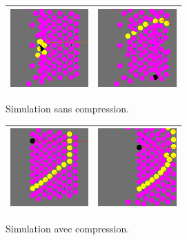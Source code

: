 \documentclass{beamer}
\begin{document}
\begin{frame}
  \begin{figure}
    \begin{tabular}{|M|M|}
      \hline
      \includegraphics[width=3cm]{Images/normal_1.png} &
      \includegraphics[width=3cm]{Images/normal_2.png} \\
      \hline
    \end{tabular}
    \caption{Simulation sans compression.}
  \end{figure}
  \begin{figure}
    \begin{tabular}{|M|M|}
      \hline
      \includegraphics[width=3cm]{Images/compression_1.png} &
      \includegraphics[width=3cm]{Images/compression_2.png} \\
      \hline
    \end{tabular}
    \caption{Simulation avec compression.}
  \end{figure}
\end{frame}
\end{document}
